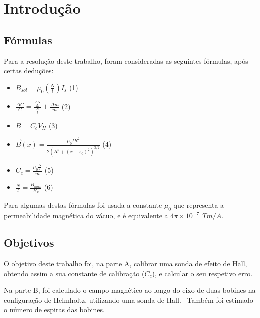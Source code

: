 
\chapter{Introdução}
\label{ch:introducao}
{
\section{Fórmulas} \label{sec:formulas}
    Para a resolução deste trabalho, foram consideradas as seguintes fórmulas, após certas deduções:
    \begin{itemize}
        \item $B_{sol} = \mu_0 (\frac{N}{l}) I_s$ (1)
        \item $\frac{\Delta C}{C} = \frac{\frac{\Delta N}{\Delta l}}{\frac{N}{l}} + \frac{\Delta m}{m}$ (2)
        \item $B = C_c V_H$ (3)
        \item $\vec{B}(x) = \frac{\mu_0 I R^2}{2(R^2 + (x - x_0)^2)^{3/2}}$ (4)
        \item $C_c = \frac{\mu_0 \frac{N}{l}}{m}$ (5)
        \item $\frac{N}{l} = \frac{B_{max}}{B_x}$ (6)
    \end{itemize}

    Para algumas destas fórmulas foi usada a constante $\mu_0$ que representa a permeabilidade magnética do vácuo, e é equivalente a $4\pi \times 10^{-7}~~Tm/A$.
\section{Objetivos} \label{sec:objetivos}
    O objetivo deste trabalho foi, na parte A, calibrar uma sonda de efeito de Hall, obtendo assim a sua constante de calibração ($C_c$), e calcular o seu respetivo erro.

    \par Na parte B, foi calculado o campo magnético ao longo do eixo de duas bobines na configuração de Helmholtz, utilizando uma sonda de Hall. \ Também foi estimado o número de espiras das bobines.
}

